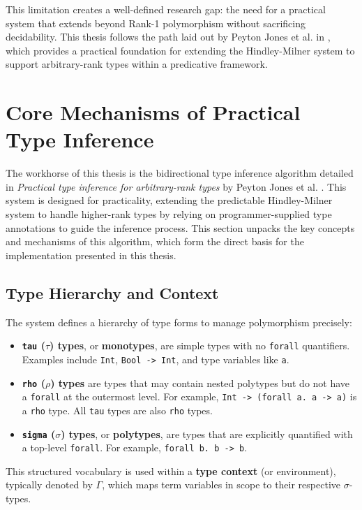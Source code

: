 This limitation creates a well-defined research gap: the need for a practical system that extends beyond Rank-1 polymorphism without sacrificing decidability. This thesis follows the path laid out by Peyton Jones et al. in \cite{jones-practical-2007}, which provides a practical foundation for extending the Hindley-Milner system to support arbitrary-rank types within a predicative framework.

\section{Core Mechanisms of Practical Type Inference}
\label{sec:LitReviewJones2007}

The workhorse of this thesis is the bidirectional type inference algorithm detailed in \textit{Practical type inference for arbitrary-rank types} by Peyton Jones et al. \cite{jones-practical-2007}. This system is designed for practicality, extending the predictable Hindley-Milner system to handle higher-rank types by relying on programmer-supplied type annotations to guide the inference process. This section unpacks the key concepts and mechanisms of this algorithm, which form the direct basis for the implementation presented in this thesis.

\subsection{Type Hierarchy and Context}
The system defines a hierarchy of type forms to manage polymorphism precisely:
\begin{itemize}
    \item \textbf{\texttt{tau} ($\tau$) types}, or \textbf{monotypes}, are simple types with no \texttt{forall} quantifiers. Examples include \texttt{Int}, \texttt{Bool -> Int}, and type variables like \texttt{a}.
    \item \textbf{\texttt{rho} ($\rho$) types} are types that may contain nested polytypes but do not have a \texttt{forall} at the outermost level. For example, \texttt{Int -> (forall a. a -> a)} is a \texttt{rho} type. All \texttt{tau} types are also \texttt{rho} types.
    \item \textbf{\texttt{sigma} ($\sigma$) types}, or \textbf{polytypes}, are types that are explicitly quantified with a top-level \texttt{forall}. For example, \texttt{forall b. b -> b}.
\end{itemize}
This structured vocabulary is used within a \textbf{type context} (or environment), typically denoted by $\Gamma$, which maps term variables in scope to their respective $\sigma$-types.

